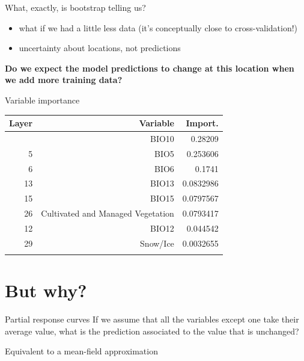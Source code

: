 \documentclass[12pt, smalloffset, compress, aspectratio=1610]{beamer}
\providecommand{\tightlist}{%
  \setlength{\itemsep}{0pt}\setlength{\parskip}{0pt}}
\begin{document}
\begin{frame}{What, exactly, is bootstrap telling us?}
\label{what-exactly-is-bootstrap-telling-us}
\begin{itemize}
\tightlist
\item
  what if we had a little less data (it's conceptually close to
  cross-validation!)
\item
  uncertainty about locations, not predictions
\end{itemize}

\textbf{Do we expect the model predictions to change at this location
when we add more training data?}
\end{frame}

\begin{frame}{Variable importance}
\label{variable-importance}
\begin{longtable}[]{@{}rrr@{}}
\toprule\noalign{}
\textbf{Layer} & \textbf{Variable} & \textbf{Import.} \\
\midrule\noalign{}
\endhead
10 & BIO10 & 0.28209 \\
5 & BIO5 & 0.253606 \\
6 & BIO6 & 0.1741 \\
13 & BIO13 & 0.0832986 \\
15 & BIO15 & 0.0797567 \\
26 & Cultivated and Managed Vegetation & 0.0793417 \\
12 & BIO12 & 0.044542 \\
29 & Snow/Ice & 0.0032655 \\
\bottomrule\noalign{}
\end{longtable}
\end{frame}

\section{But why?}\label{but-why-1}

\begin{frame}{Partial response curves}
\label{partial-response-curves}
If we assume that all the variables except one take their average value,
what is the prediction associated to the value that is unchanged?

Equivalent to a mean-field approximation
\end{frame}
\end{document}
